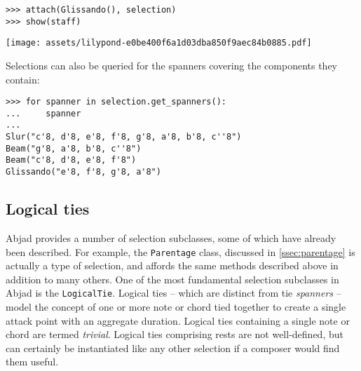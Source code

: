 \begin{comment}
<abjad>
attach(Glissando(), selection)
show(staff)
</abjad>
\end{comment}

\begin{abjadbookoutput}
\begin{singlespacing}
\vspace{-0.5\baselineskip}
\begin{verbatim}
>>> attach(Glissando(), selection)
>>> show(staff)
\end{verbatim}
\noindent\texttt{[image: assets/lilypond-e0be400f6a1d03dba850f9aec84b0885.pdf]}
\end{singlespacing}
\end{abjadbookoutput}

\noindent Selections can also be queried for the spanners covering the
components they contain:

\begin{comment}
<abjad>
for spanner in selection.get_spanners():
    spanner

</abjad>
\end{comment}

\begin{abjadbookoutput}
\begin{singlespacing}
\vspace{-0.5\baselineskip}
\begin{verbatim}
>>> for spanner in selection.get_spanners():
...     spanner
...
Slur("c'8, d'8, e'8, f'8, g'8, a'8, b'8, c''8")
Beam("g'8, a'8, b'8, c''8")
Beam("c'8, d'8, e'8, f'8")
Glissando("e'8, f'8, g'8, a'8")
\end{verbatim}
\end{singlespacing}
\end{abjadbookoutput}

\subsection{Logical ties}
\label{ssec:logical-ties}

Abjad provides a number of selection subclasses, some of which have already
been described. For example, the \texttt{Parentage} class, discussed in
\autoref{ssec:parentage} is actually a type of selection, and affords the same
methods described above in addition to many others. One of the most fundamental
selection subclasses in Abjad is the \texttt{LogicalTie}. Logical ties -- which
are distinct from tie \emph{spanners} -- model the concept of one or more note
or chord tied together to create a single attack point with an aggregate
duration. Logical ties containing a single note or chord are termed
\emph{trivial}. Logical ties comprising rests are not well-defined, but can
certainly be instantiated like any other selection if a composer would find
them useful.

